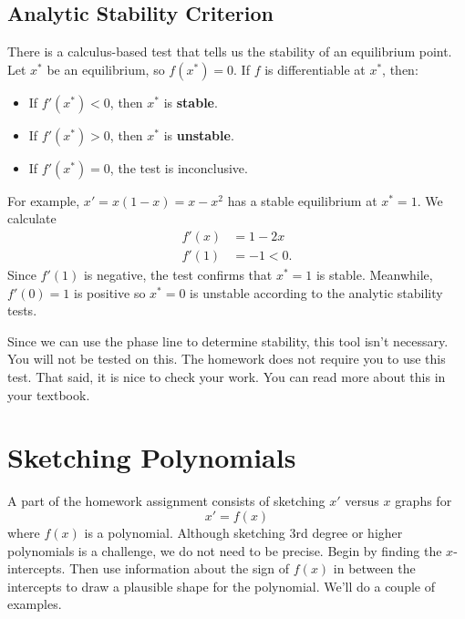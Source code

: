 \documentclass[10pt,letterpaper]{article}
\begin{document}
\subsection{Analytic Stability Criterion}
There is a calculus-based test that tells us the stability of an equilibrium point. Let $x^*$ be an equilibrium, so $f(x^*)=0$.
If $f$ is differentiable at $x^*$, then:
\begin{itemize}
    \item If $f'(x^*)<0$, then $x^*$ is \textbf{stable}.
    \item If $f'(x^*)>0$, then $x^*$ is \textbf{unstable}.
    \item If $f'(x^*)=0$, the test is inconclusive. 
\end{itemize}
For example, $x'=x(1-x)=x-x^2$ has a stable equilibrium at $x^*=1$. We calculate 
\begin{align*}    
f'(x) &= 1-2x\\
f'(1)&=-1<0.
\end{align*}
Since $f'(1)$ is negative, the test confirms that $x^*=1$ is stable. Meanwhile, $f'(0)=1$ is positive so $x^*=0$ is unstable according to the analytic stability tests. 

Since we can use the phase line to determine stability, this tool isn't necessary. You will not be tested on this. The homework does not require you to use this test.  That said, it is nice to check your work. You can read more about this in your textbook. 

\section{Sketching Polynomials}


A part of the homework assignment consists of sketching $x'$ versus $x$ graphs for
$$
x'=f(x)
$$
where $f(x)$ is a polynomial. Although sketching 3rd degree or higher polynomials is a challenge, we do not need to be precise. Begin by finding the $x$-intercepts. Then use information about the sign of $f(x)$ in between the intercepts to draw a plausible shape for the polynomial. We'll do a couple of examples.
\end{document}
